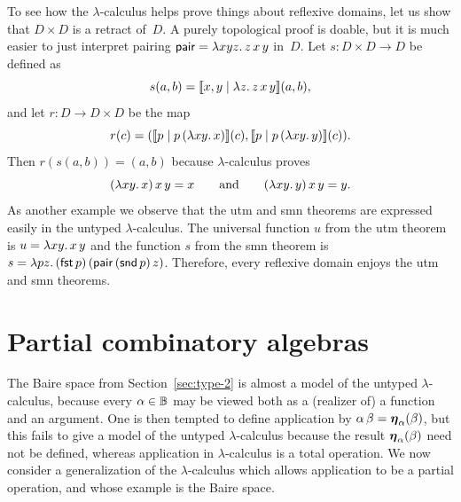 To see how the $\lambda$-calculus helps prove things about reflexive
domains, let us show that $D \times D$ is a retract of~$D$. A purely
topological proof is doable, but it is much easier to just interpret
pairing $\mathsf{pair} = \lambda x y z .\,z\,x\,y$ in~$D$. Let $s : D
\times D \to D$ be defined as
%
\begin{equation*}
  s (a, b) = [\![x,y \mid \lambda z .\,z\,x\,y]\!](a,b),
\end{equation*}
%
and let $r : D \to D \times D$ be the map
%
\begin{equation*}
  r(c) = ([\![p \mid p\,(\lambda x y .\,x)]\!](c),
          [\![p \mid p\,(\lambda x y .\,y)]\!](c)).
\end{equation*}
%
Then $r (s (a, b)) = (a, b)$ because $\lambda$-calculus proves
%
\begin{equation*}
  (\lambda x y .\,x)\, x \, y = x
  \qquad\text{and}\qquad
  (\lambda x y .\,y)\, x \, y = y.
\end{equation*}
%
As another example we observe that the utm and smn theorems are
expressed easily in the untyped $\lambda$-calculus. The universal
function $u$ from the utm theorem is $u = \lambda x y .\,x\, y$ and the
function $s$ from the smn theorem is $s = \lambda p
  z .\,(\mathsf{fst}\,p)\,(\mathsf{pair}\,(\mathsf{snd}\, p)\,z)$.
Therefore, every reflexive domain enjoys the utm and smn theorems.


\section{Partial combinatory algebras}
\label{sec:pcas}

The Baire space from Section~\ref{sec:type-2} is almost a model of the
untyped $\lambda$-calculus, because every $\alpha \in \mathbb{B}$ may be
viewed both as a (realizer of) a function and an argument. One is then
tempted to define application by $\alpha \, \beta =
\text{\boldmath{$\eta$}}_{\alpha}(\beta)$, but this fails to give a model of the untyped
$\lambda$-calculus because the result $\text{\boldmath{$\eta$}}_{\alpha}(\beta)$ need not
be defined, whereas application in $\lambda$-calculus is a total
operation. We now consider a generalization of the $\lambda$-calculus
which allows application to be a partial operation, and whose example
is the Baire space.

